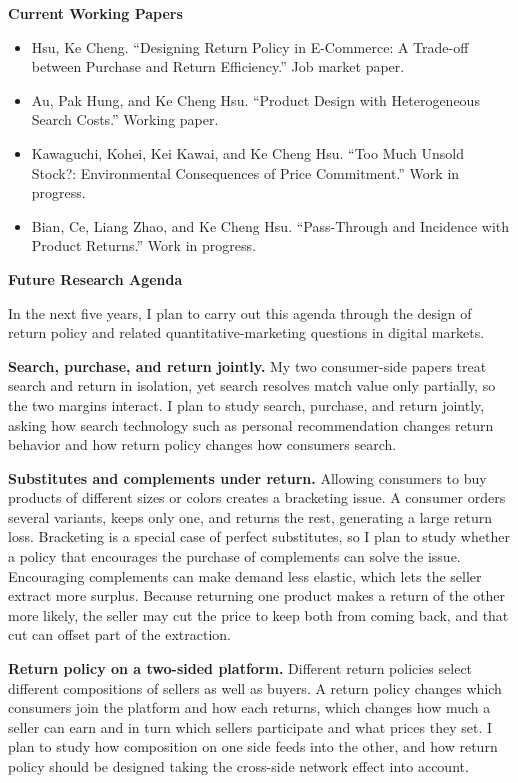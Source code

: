 \documentclass[11pt]{article}
\begin{document}
\textbf{Current Working Papers}

\begin{itemize}
  \item Hsu, Ke Cheng. ``Designing Return Policy in E-Commerce: A Trade-off between Purchase and Return Efficiency.'' Job market paper.
  \item Au, Pak Hung, and Ke Cheng Hsu. ``Product Design with Heterogeneous Search Costs.'' Working paper.
  \item Kawaguchi, Kohei, Kei Kawai, and Ke Cheng Hsu. ``Too Much Unsold Stock?: Environmental Consequences of Price Commitment.'' Work in progress.
  \item Bian, Ce, Liang Zhao, and Ke Cheng Hsu. ``Pass-Through and Incidence with Product Returns.'' Work in progress.
\end{itemize}

\textbf{Future Research Agenda}

In the next five years, I plan to carry out this agenda through the design of return policy and related quantitative-marketing questions in digital markets.

\textbf{Search, purchase, and return jointly.} My two consumer-side papers treat search and return in isolation, yet search resolves match value only partially, so the two margins interact. I plan to study search, purchase, and return jointly, asking how search technology such as personal recommendation changes return behavior and how return policy changes how consumers search.

\textbf{Substitutes and complements under return.} Allowing consumers to buy products of different sizes or colors creates a bracketing issue. A consumer orders several variants, keeps only one, and returns the rest, generating a large return loss. Bracketing is a special case of perfect substitutes, so I plan to study whether a policy that encourages the purchase of complements can solve the issue. Encouraging complements can make demand less elastic, which lets the seller extract more surplus. Because returning one product makes a return of the other more likely, the seller may cut the price to keep both from coming back, and that cut can offset part of the extraction.

\textbf{Return policy on a two-sided platform.} Different return policies select different compositions of sellers as well as buyers. A return policy changes which consumers join the platform and how each returns, which changes how much a seller can earn and in turn which sellers participate and what prices they set. I plan to study how composition on one side feeds into the other, and how return policy should be designed taking the cross-side network effect into account.
\end{document}
